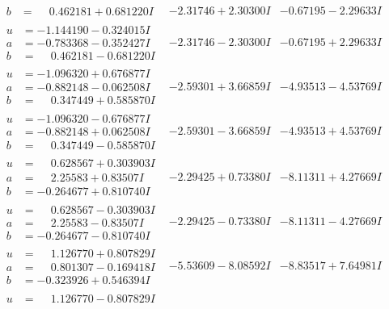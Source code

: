 \documentclass[1p]{elsarticle_modified}
\theoremstyle{definition}
\begin{document}
$$\begin{array}{c|c|c}
\begin{aligned}
b &= \phantom{-}0.462181 + 0.681220 I\end{aligned}
 & -2.31746 + 2.30300 I & -0.67195 - 2.29633 I \\ \hline\begin{aligned}
u &= -1.144190 - 0.324015 I \\
a &= -0.783368 - 0.352427 I \\
b &= \phantom{-}0.462181 - 0.681220 I\end{aligned}
 & -2.31746 - 2.30300 I & -0.67195 + 2.29633 I \\ \hline\begin{aligned}
u &= -1.096320 + 0.676877 I \\
a &= -0.882148 - 0.062508 I \\
b &= \phantom{-}0.347449 + 0.585870 I\end{aligned}
 & -2.59301 + 3.66859 I & -4.93513 - 4.53769 I \\ \hline\begin{aligned}
u &= -1.096320 - 0.676877 I \\
a &= -0.882148 + 0.062508 I \\
b &= \phantom{-}0.347449 - 0.585870 I\end{aligned}
 & -2.59301 - 3.66859 I & -4.93513 + 4.53769 I \\ \hline\begin{aligned}
u &= \phantom{-}0.628567 + 0.303903 I \\
a &= \phantom{-}2.25583 + 0.83507 I \\
b &= -0.264677 + 0.810740 I\end{aligned}
 & -2.29425 + 0.73380 I & -8.11311 + 4.27669 I \\ \hline\begin{aligned}
u &= \phantom{-}0.628567 - 0.303903 I \\
a &= \phantom{-}2.25583 - 0.83507 I \\
b &= -0.264677 - 0.810740 I\end{aligned}
 & -2.29425 - 0.73380 I & -8.11311 - 4.27669 I \\ \hline\begin{aligned}
u &= \phantom{-}1.126770 + 0.807829 I \\
a &= \phantom{-}0.801307 - 0.169418 I \\
b &= -0.323926 + 0.546394 I\end{aligned}
 & -5.53609 - 8.08592 I & -8.83517 + 7.64981 I \\ \hline\begin{aligned}
u &= \phantom{-}1.126770 - 0.807829 I \\

\end{aligned}
\end{array}$$
\end{document}
